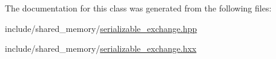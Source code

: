The documentation for this class was generated from the following files\+:\begin{DoxyCompactItemize}
\item 
include/shared\+\_\+memory/\hyperlink{serializable__exchange_8hpp}{serializable\+\_\+exchange.\+hpp}\item 
include/shared\+\_\+memory/\hyperlink{serializable__exchange_8hxx}{serializable\+\_\+exchange.\+hxx}\end{DoxyCompactItemize}
